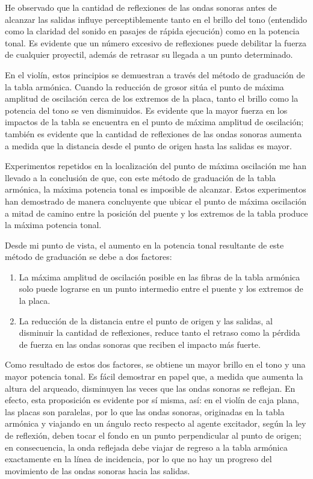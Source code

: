 \documentclass[12pt]{book}
\begin{document}
He observado que la cantidad de reflexiones de las ondas sonoras antes de alcanzar las salidas influye perceptiblemente tanto en el brillo del tono (entendido como la claridad del sonido en pasajes de rápida ejecución) como en la potencia tonal. Es evidente que un número excesivo de reflexiones puede debilitar la fuerza de cualquier proyectil, además de retrasar su llegada a un punto determinado.

En el violín, estos principios se demuestran a través del método de graduación de la tabla armónica. Cuando la reducción de grosor sitúa el punto de máxima amplitud de oscilación cerca de los extremos de la placa, tanto el brillo como la potencia del tono se ven disminuidos. Es evidente que la mayor fuerza en los impactos de la tabla se encuentra en el punto de máxima amplitud de oscilación; también es evidente que la cantidad de reflexiones de las ondas sonoras aumenta a medida que la distancia desde el punto de origen hasta las salidas es mayor.

Experimentos repetidos en la localización del punto de máxima oscilación me han llevado a la conclusión de que, con este método de graduación de la tabla armónica, la máxima potencia tonal es imposible de alcanzar. Estos experimentos han demostrado de manera concluyente que ubicar el punto de máxima oscilación a mitad de camino entre la posición del puente y los extremos de la tabla produce la máxima potencia tonal.

Desde mi punto de vista, el aumento en la potencia tonal resultante de este método de graduación se debe a dos factores:

\begin{enumerate}
    \item La máxima amplitud de oscilación posible en las fibras de la tabla armónica solo puede lograrse en un punto intermedio entre el puente y los extremos de la placa.
    \item La reducción de la distancia entre el punto de origen y las salidas, al disminuir la cantidad de reflexiones, reduce tanto el retraso como la pérdida de fuerza en las ondas sonoras que reciben el impacto más fuerte.
\end{enumerate}

Como resultado de estos dos factores, se obtiene un mayor brillo en el tono y una mayor potencia tonal.
Es fácil demostrar en papel que, a medida que aumenta la altura del arqueado, disminuyen las veces que las ondas sonoras se reflejan. En efecto, esta proposición es evidente por sí misma, así: en el violín de caja plana, las placas son paralelas, por lo que las ondas sonoras, originadas en la tabla armónica y viajando en un ángulo recto respecto al agente excitador, según la ley de reflexión, deben tocar el fondo en un punto perpendicular al punto de origen; en consecuencia, la onda reflejada debe viajar de regreso a la tabla armónica exactamente en la línea de incidencia, por lo que no hay un progreso del movimiento de las ondas sonoras hacia las salidas. 
\end{document}

